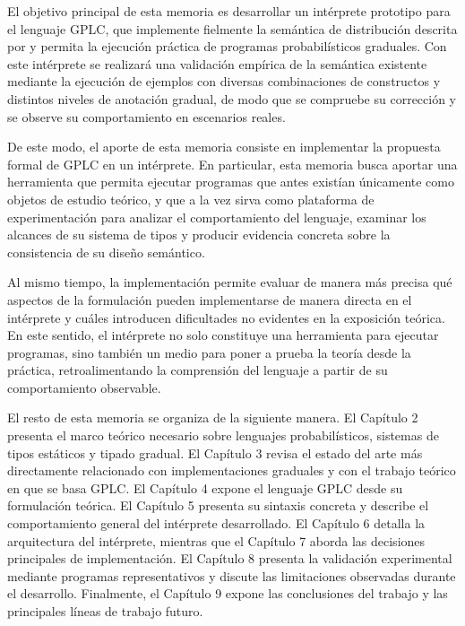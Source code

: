 El objetivo principal de esta memoria es desarrollar un intérprete
prototipo para el lenguaje GPLC, que implemente fielmente la semántica
de distribución descrita por \cite{gplc} y permita la ejecución
práctica de programas probabilísticos graduales. Con este intérprete
se realizará una validación empírica de la semántica existente
mediante la ejecución de ejemplos con diversas combinaciones de
constructos y distintos niveles de anotación gradual, de modo que se
compruebe su corrección y se observe su comportamiento en escenarios
reales.

De este modo, el aporte de esta memoria consiste en implementar la
propuesta formal de GPLC en un intérprete. En particular, esta memoria
busca aportar una herramienta que permita ejecutar programas que antes
existían únicamente como objetos de estudio teórico, y que a la vez
sirva como plataforma de experimentación para analizar el
comportamiento del lenguaje, examinar los alcances de su sistema de
tipos y producir evidencia concreta sobre la consistencia de su diseño
semántico.

Al mismo tiempo, la implementación permite evaluar de manera más
precisa qué aspectos de la formulación pueden implementarse de manera
directa en el intérprete y cuáles introducen dificultades no evidentes
en la exposición teórica. En este sentido, el intérprete no solo
constituye una herramienta para ejecutar programas, sino también un
medio para poner a prueba la teoría desde la práctica,
retroalimentando la comprensión del lenguaje a partir de su
comportamiento observable.

El resto de esta memoria se organiza de la siguiente manera. El
Capítulo 2 presenta el marco teórico necesario sobre lenguajes
probabilísticos, sistemas de tipos estáticos y tipado gradual. El
Capítulo 3 revisa el estado del arte más directamente relacionado con
implementaciones graduales y con el trabajo teórico en que se basa
GPLC. El Capítulo 4 expone el lenguaje GPLC desde su formulación
teórica. El Capítulo 5 presenta su sintaxis concreta y describe el
comportamiento general del intérprete desarrollado. El Capítulo 6
detalla la arquitectura del intérprete, mientras que el Capítulo 7
aborda las decisiones principales de implementación. El Capítulo 8
presenta la validación experimental mediante programas representativos
y discute las limitaciones observadas durante el
desarrollo. Finalmente, el Capítulo 9 expone las conclusiones del
trabajo y las principales líneas de trabajo futuro.

